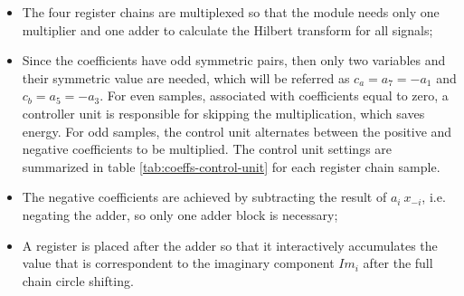 \begin{itemize}
	\item The four register chains are multiplexed so that the module needs only one multiplier and one adder to calculate the Hilbert transform for all signals;
	
	\item Since the coefficients have odd symmetric pairs, then only two variables and their symmetric value are needed, which will be referred as $c_a = a_7 = - a_1$ and $c_b = a_5 = - a_3$. For even samples, associated with coefficients equal to zero, a controller unit is responsible for skipping the multiplication, which saves energy. For odd samples, the control unit alternates between the positive and negative coefficients to be multiplied. The control unit settings are summarized in table \ref{tab:coeffs-control-unit} for each register chain sample. 
	
	\begin{table}[!htbp] %
		\begin{center}
			\caption{Hilbert filter control unit settings for each processed sample with $c_a = 0.23932$ and $c_b = 0.62610$}
			\label{tab:coeffs-control-unit}
		\end{center}
	\end{table}
	
	\item The negative coefficients are achieved by subtracting the result of $a_{i} \ x_{-i}$, i.e. negating the adder, so only one adder block is necessary;
	
	\item A register is placed after the adder so that it interactively accumulates the value that is correspondent to the imaginary component $Im_i$ after the full chain circle shifting.
	
\end{itemize}

